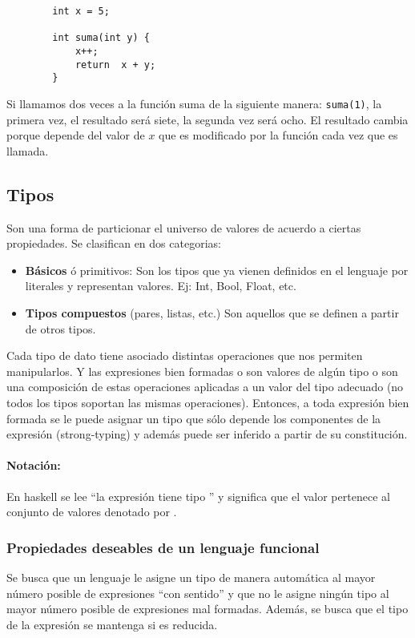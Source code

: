 \begin{centrado}
	\begin{verbatim}
		int x = 5;
		
		int suma(int y) {
			x++;
			return  x + y;
		}
	\end{verbatim}
\end{centrado}

Si llamamos dos veces a la función suma de la siguiente manera: \texttt{suma(1)}, la primera vez, el resultado será siete, la segunda vez será ocho. El resultado cambia porque depende del valor de $x$ que es modificado por la función cada vez que es llamada.

\subsection{Tipos}
Son una forma de particionar el universo de valores de acuerdo a ciertas propiedades. Se clasifican en dos categorias:
\begin{itemize}
	\item \textbf{Básicos} ó primitivos: Son los tipos que ya vienen definidos en el lenguaje por literales y representan valores. Ej: Int, Bool, Float, etc.
	\item \textbf{Tipos compuestos} (pares, listas, etc.) Son aquellos que se definen a partir de otros tipos.
\end{itemize}

Cada tipo de dato tiene asociado distintas operaciones que nos permiten manipularlos. Y las expresiones bien formadas o son valores de algún tipo o son una composición de estas operaciones aplicadas a un valor del tipo adecuado (no todos los tipos soportan las mismas operaciones). Entonces, a toda expresión bien formada se le puede asignar un tipo que sólo depende los componentes de la expresión (strong-typing) y además puede ser inferido a partir de su constitución.

\paragraph{Notación:}   En haskell  se lee “la expresión  tiene tipo ” y significa que el valor  pertenece al conjunto de valores denotado por .

\subsubsection{Propiedades deseables de un lenguaje funcional}
Se busca que un lenguaje le asigne un tipo de manera automática al mayor número posible de expresiones ``con sentido'' y que no le asigne ningún tipo al mayor número posible de expresiones mal formadas. Además, se busca que el tipo de la expresión se mantenga si es reducida.

